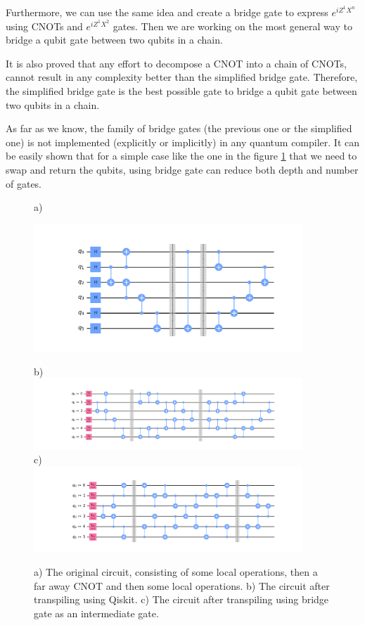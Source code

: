 \documentclass{article}
\begin{document}
  Furthermore, we can use the same idea and create a bridge gate to express $e^{iZ^{1}X^{n}}$ using CNOTs and $e^{iZ^{1}X^{2}}$ gates. Then we are working on the most general way to bridge a qubit gate between two qubits in a chain.

  It is also proved that any effort to decompose a CNOT into a chain of CNOTs, cannot result in any complexity better than the simplified bridge gate. Therefore, the simplified bridge gate is the best possible gate to bridge a qubit gate between two qubits in a chain.

  As far as we know, the family of bridge gates (the previous one or the simplified one) is not implemented (explicitly or implicitly) in any quantum compiler. 
  It can be easily shown that for a simple case like the one in the figure \ref{fig:compliation-using-bridge} that we need to swap and return the qubits, using bridge gate can reduce both depth and number of gates.

  \begin{figure}
    a) \\
    \begin{center}
    \includegraphics[width=0.9\textwidth]{../../code/expm_1_bridge/out/original_circuit}
    \end{center}
    b) \\
    \includegraphics[width=0.9\textwidth]{../../code/expm_1_bridge/out/transpiled_circuit_swap} \\
    c) \\
    \includegraphics[width=0.9\textwidth]{../../code/expm_1_bridge/out/transpiled_circuit_bridge}
    \caption{a) The original circuit, consisting of some local operations, then a far away CNOT and then some local operations. b) The circuit after transpiling using Qiskit. c) The circuit after transpiling using bridge gate as an intermediate gate.}
    \label{fig:compliation-using-bridge}
  \end{figure}
\end{document}

